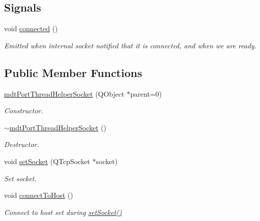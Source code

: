 \subsection*{Signals}
\begin{DoxyCompactItemize}
\item 
void \hyperlink{classmdt_port_thread_helper_socket_abd11bd8f13c7180389e8bf2249c643bf}{connected} ()
\begin{DoxyCompactList}\small\item\em Emitted when internal socket notified that it is connected, and when we are ready. \end{DoxyCompactList}\end{DoxyCompactItemize}
\subsection*{Public Member Functions}
\begin{DoxyCompactItemize}
\item 
\hyperlink{classmdt_port_thread_helper_socket_aa77afb8d26e4863bd437e0d59efae7a7}{mdt\-Port\-Thread\-Helper\-Socket} (Q\-Object $\ast$parent=0)
\begin{DoxyCompactList}\small\item\em Constructor. \end{DoxyCompactList}\item 
\hyperlink{classmdt_port_thread_helper_socket_a7fee8df32e619eb76bf365785a8b95b4}{$\sim$mdt\-Port\-Thread\-Helper\-Socket} ()
\begin{DoxyCompactList}\small\item\em Destructor. \end{DoxyCompactList}\item 
void \hyperlink{classmdt_port_thread_helper_socket_ab8d22e337e1cc2e043683da8b8a034e5}{set\-Socket} (Q\-Tcp\-Socket $\ast$socket)
\begin{DoxyCompactList}\small\item\em Set socket. \end{DoxyCompactList}\item 
void \hyperlink{classmdt_port_thread_helper_socket_a1948457ffe9027edfe3fcf5c01e8d7e1}{connect\-To\-Host} ()
\begin{DoxyCompactList}\small\item\em Connect to host set during \hyperlink{classmdt_port_thread_helper_socket_ab8d22e337e1cc2e043683da8b8a034e5}{set\-Socket()} \end{DoxyCompactList}\end{DoxyCompactItemize}

